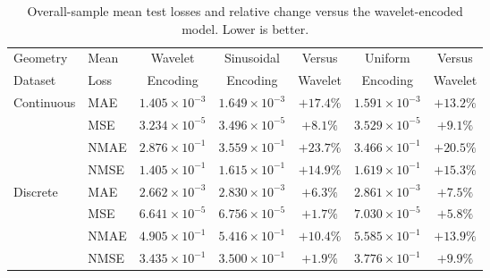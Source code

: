 \documentclass[preprint,review,12pt,numafflabel]{elsarticle}
\begin{document}
\begin{table}[H]
    \centering
    \small
    \begin{tabular}{llccccc}
        \toprule
        Geometry & Mean & Wavelet & Sinusoidal & Versus & Uniform & Versus \\
        Dataset & Loss & Encoding & Encoding & Wavelet & Encoding & Wavelet \\
        \midrule
        \multirow{4}{*}{Continuous}
            & MAE  & $1.405\times10^{-3}$ & $1.649\times10^{-3}$ & $+17.4\%$ & $1.591\times10^{-3}$ & $+13.2\%$ \\
            & MSE  & $3.234\times10^{-5}$ & $3.496\times10^{-5}$ & $+8.1\%$  & $3.529\times10^{-5}$ & $+9.1\%$ \\
            & NMAE & $2.876\times10^{-1}$ & $3.559\times10^{-1}$ & $+23.7\%$ & $3.466\times10^{-1}$ & $+20.5\%$ \\
            & NMSE & $1.405\times10^{-1}$ & $1.615\times10^{-1}$ & $+14.9\%$ & $1.619\times10^{-1}$ & $+15.3\%$ \\
        \midrule
        \multirow{4}{*}{Discrete}
            & MAE  & $2.662\times10^{-3}$ & $2.830\times10^{-3}$ & $+6.3\%$  & $2.861\times10^{-3}$ & $+7.5\%$ \\
            & MSE  & $6.641\times10^{-5}$ & $6.756\times10^{-5}$ & $+1.7\%$  & $7.030\times10^{-5}$ & $+5.8\%$ \\
            & NMAE & $4.905\times10^{-1}$ & $5.416\times10^{-1}$ & $+10.4\%$ & $5.585\times10^{-1}$ & $+13.9\%$ \\
            & NMSE & $3.435\times10^{-1}$ & $3.500\times10^{-1}$ & $+1.9\%$  & $3.776\times10^{-1}$ & $+9.9\%$ \\
        \bottomrule
    \end{tabular}
    \caption{Overall-sample mean test losses and relative change versus the wavelet-encoded model. Lower is better.}
    \label{tab:encoding_ablation_mean}
\end{table}
\end{document}
